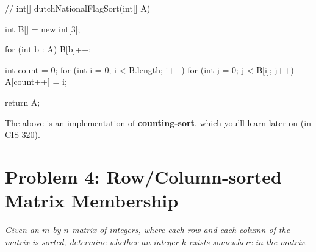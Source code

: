 \begin{java}
    //
    int[] dutchNationalFlagSort(int[] A) {
        int B[] = new int[3];

        for (int b : A) {
            B[b]++;
        }

        int count = 0;
        for (int i = 0; i < B.length; i++) {
            for (int j = 0; j < B[i]; j++) {
                A[count++] = i;
            }
        }

        return A;
    }
\end{java}

The above is an implementation of \textbf{counting-sort}, which you'll learn later on (in CIS 320).

\section*{Problem 4: Row/Column-sorted Matrix Membership}
\textit{Given an $m$ by $n$ matrix of integers, where each row and each column of the matrix is sorted, determine whether an integer $k$ exists somewhere in the matrix.}
